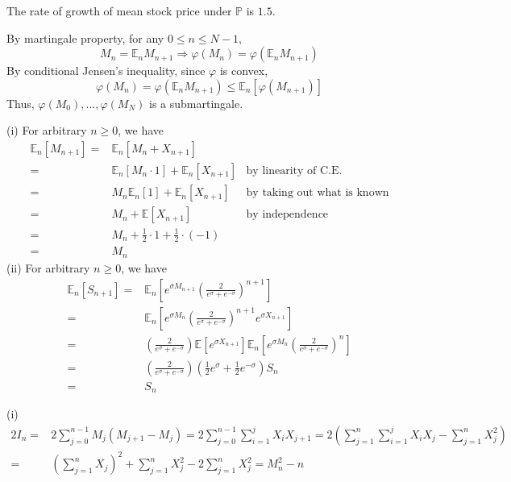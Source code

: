 \documentclass[12pt]{article}
\newenvironment{problem}[2][Problem]{\begin{trivlist}
		\item[\hskip \labelsep {\bfseries #1}\hskip \labelsep {\bfseries #2.}]}{\end{trivlist}}
\begin{document}
	The rate of growth of mean stock price under $\mathbb{P}$ is $1.5$. \\
	\begin{problem}{3}\end{problem}
	By martingale property, for any $0\le n\le N-1$, 
	$$M_n = \mathbb{E}_nM_{n+1} \Rightarrow \varphi(M_n) = \varphi(\mathbb{E}_nM_{n+1})$$
	By conditional Jensen's inequality, since $\varphi$ is convex,
	$$\varphi(M_n) = \varphi(\mathbb{E}_n M_{n+1})\le \mathbb{E}_n[\varphi(M_{n+1})]$$
	Thus, $\varphi(M_0),...,\varphi(M_N)$ is a submartingale. 
	\begin{problem}{4}\end{problem}
	(i) For arbitrary $n\ge 0$, we have
	\begin{align*}
	\mathbb{E}_n[M_{n+1}] =& \mathbb{E}_n[M_n + X_{n+1}] & \\
	=&\mathbb{E}_n[M_n\cdot 1] + \mathbb{E}_n[X_{n+1}] &\text{by linearity of C.E.}\\
	=&M_n\mathbb{E}_n[1] + \mathbb{E}_n[X_{n+1}] &\text{by taking out what is known}\\
	=&M_n + \mathbb{E}[X_{n+1}] &\text{by independence}\\
	=&M_n + \frac{1}{2}\cdot 1+\frac{1}{2}\cdot (-1)  &\\
	=&M_n & 
	\end{align*}
	(ii) For arbitrary $n\ge 0$, we have
	\begin{align*}
	\mathbb{E}_n[S_{n+1}] =& \mathbb{E}_n\left[e^{\sigma M_{n+1}}\left(\frac{2}{e^\sigma+e^{-\sigma}}\right)^{n+1}\right]\\
	=&\mathbb{E}_n\left[e^{\sigma M_n}\left(\frac{2}{e^\sigma+e^{-\sigma}}\right)^{n+1}e^{\sigma X_{n+1}}\right]\\
	=&\left(\frac{2}{e^\sigma+e^{-\sigma}}\right)\mathbb{E}\left[e^{\sigma X_{n+1}}\right] \mathbb{E}_n\left[e^{\sigma M_n}\left(\frac{2}{e^\sigma+e^{-\sigma}}\right)^n\right]\\
	=&\left(\frac{2}{e^\sigma+e^{-\sigma}}\right)\left(\frac{1}{2}e^\sigma+\frac{1}{2}e^{-\sigma}\right)S_n\\
	=&S_n
	\end{align*}
	\begin{problem}{5}\end{problem}
	(i) \begin{align*}
	2I_n=&2\sum_{j=0}^{n-1}M_j(M_{j+1}-M_j)=2\sum_{j=0}^{n-1} \sum_{i=1}^j X_iX_{j+1}
	=2\left(\sum_{j=1}^{n} \sum_{i=1}^{j} X_iX_{j}-\sum_{j=1}^n X_j^2\right)\\
	=&\left(\sum_{j=1}^nX_j\right)^2+\sum_{j=1}^nX_j^2 - 2\sum_{j=1}^nX_j^2 = M_n^2 - n
	\end{align*}
\end{document}
